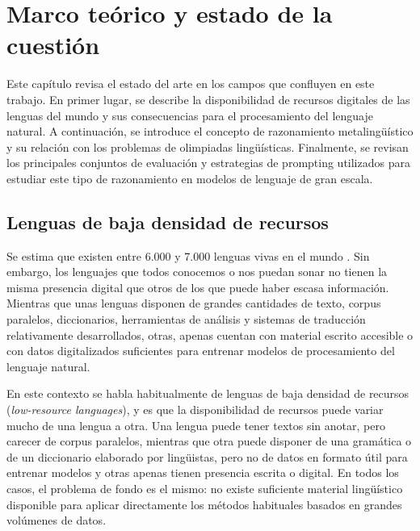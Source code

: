 \chapter{Marco teórico y estado de la cuestión}
\label{cap:marcoteorico}

Este capítulo revisa el estado del arte en los campos que confluyen en este trabajo. En primer lugar, se describe la disponibilidad de recursos digitales de las lenguas del mundo y sus consecuencias para el procesamiento del lenguaje natural. A continuación, se introduce el concepto de razonamiento metalingüístico y su relación con los problemas de olimpiadas lingüísticas. Finalmente, se revisan los principales conjuntos de evaluación y estrategias de prompting utilizados para estudiar este tipo de razonamiento en modelos de lenguaje de gran escala.

\section{Lenguas de baja densidad de recursos}
\label{sec:lowresource}

Se estima que existen entre 6.000 y 7.000 lenguas vivas en el mundo \citep{eberhard2020ethnologue}. Sin embargo, los lenguajes que todos conocemos o nos puedan sonar no tienen la misma presencia digital que otros de los que puede haber escasa información. Mientras que unas lenguas disponen de grandes cantidades de texto, corpus paralelos, diccionarios, herramientas de análisis y sistemas de traducción relativamente desarrollados, otras, apenas cuentan con material escrito accesible o con datos digitalizados suficientes para entrenar modelos de procesamiento del lenguaje natural.

En este contexto se habla habitualmente de lenguas de baja densidad de recursos (\textit{low-resource languages}), y es que la disponibilidad de recursos puede variar mucho de una lengua a otra. Una lengua puede tener textos sin anotar, pero carecer de corpus paralelos, mientras que otra puede disponer de una gramática o de un diccionario elaborado por lingüistas, pero no de datos en formato útil para entrenar modelos y otras apenas tienen presencia escrita o digital. En todos los casos, el problema de fondo es el mismo: no existe suficiente material lingüístico disponible para aplicar directamente los métodos habituales basados en grandes volúmenes de datos.

